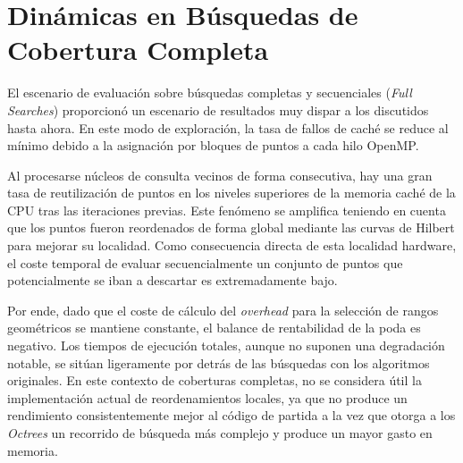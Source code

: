 \section{Dinámicas en Búsquedas de Cobertura Completa}

El escenario de evaluación sobre búsquedas completas y secuenciales (\textit{Full Searches}) proporcionó un escenario de resultados muy dispar a los discutidos hasta ahora. En este modo de exploración, la tasa de fallos de caché se reduce al mínimo debido a la asignación por bloques de puntos a cada hilo OpenMP.

Al procesarse núcleos de consulta vecinos de forma consecutiva, hay una gran tasa de reutilización de puntos en los niveles superiores de la memoria caché de la CPU tras las iteraciones previas. Este fenómeno se amplifica teniendo en cuenta que los puntos fueron reordenados de forma global mediante las curvas de Hilbert para mejorar su localidad. Como consecuencia directa de esta localidad hardware, el coste temporal de evaluar secuencialmente un conjunto de puntos que potencialmente se iban a descartar es extremadamente bajo. 

Por ende, dado que el coste de cálculo del \textit{overhead} para la selección de rangos geométricos se mantiene constante, el balance de rentabilidad de la poda es negativo. Los tiempos de ejecución totales, aunque no suponen una degradación notable, se sitúan ligeramente por detrás de las búsquedas con los algoritmos originales. En este contexto de coberturas completas, no se considera útil la implementación actual de reordenamientos locales, ya que no produce un rendimiento consistentemente mejor al código de partida a la vez que otorga a los \textit{Octrees} un recorrido de búsqueda más complejo y produce un mayor gasto en memoria. 